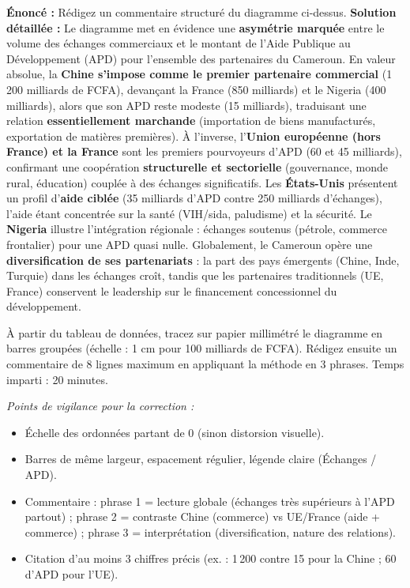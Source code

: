\documentclass[11pt]{article}
\begin{document}
\begin{exoresolu}
\textbf{Énoncé :} Rédigez un commentaire structuré du diagramme ci-dessus.
\tcblower
\textbf{Solution détaillée :}
Le diagramme met en évidence une \textbf{asymétrie marquée} entre le volume des échanges commerciaux et le montant de l'Aide Publique au Développement (APD) pour l'ensemble des partenaires du Cameroun. En valeur absolue, la \textbf{Chine s'impose comme le premier partenaire commercial} (1\,200 milliards de FCFA), devançant la France (850 milliards) et le Nigeria (400 milliards), alors que son APD reste modeste (15 milliards), traduisant une relation \textbf{essentiellement marchande} (importation de biens manufacturés, exportation de matières premières). À l'inverse, l'\textbf{Union européenne (hors France) et la France} sont les premiers pourvoyeurs d'APD (60 et 45 milliards), confirmant une coopération \textbf{structurelle et sectorielle} (gouvernance, monde rural, éducation) couplée à des échanges significatifs. Les \textbf{États-Unis} présentent un profil d'\textbf{aide ciblée} (35 milliards d'APD contre 250 milliards d'échanges), l'aide étant concentrée sur la santé (VIH/sida, paludisme) et la sécurité. Le \textbf{Nigeria} illustre l'intégration régionale : échanges soutenus (pétrole, commerce frontalier) pour une APD quasi nulle. Globalement, le Cameroun opère une \textbf{diversification de ses partenariats} : la part des pays émergents (Chine, Inde, Turquie) dans les échanges croît, tandis que les partenaires traditionnels (UE, France) conservent le leadership sur le financement concessionnel du développement.
\end{exoresolu}

\begin{exercice}
À partir du tableau de données, tracez sur papier millimétré le diagramme en barres groupées (échelle : 1 cm pour 100 milliards de FCFA). Rédigez ensuite un commentaire de 8 lignes maximum en appliquant la méthode en 3 phrases. Temps imparti : 20 minutes.
\end{exercice}

\begin{corrige}[Exercice TP 2]
\emph{Points de vigilance pour la correction :}
\begin{itemize}
    \item Échelle des ordonnées partant de 0 (sinon distorsion visuelle).
    \item Barres de même largeur, espacement régulier, légende claire (Échanges / APD).
    \item Commentaire : phrase 1 = lecture globale (échanges très supérieurs à l'APD partout) ; phrase 2 = contraste Chine (commerce) vs UE/France (aide + commerce) ; phrase 3 = interprétation (diversification, nature des relations).
    \item Citation d'au moins 3 chiffres précis (ex. : 1\,200 contre 15 pour la Chine ; 60 d'APD pour l'UE).
\end{itemize}
\end{corrige}
\end{document}
